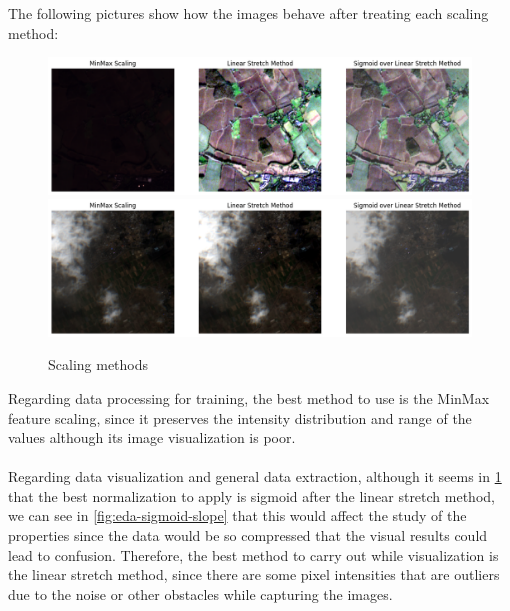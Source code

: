 The following pictures show how the images behave after treating each scaling method:
\begin{figure}[H]
	\centering
	\includegraphics[width=15cm]{imgs/eda/scaled-methods-1}\\
	\includegraphics[width=15cm]{imgs/eda/scaled-methods-2}
	\caption{Scaling methods}
	\label{fig:scaling-methods}
\end{figure}
Regarding data processing for training, the best method to use is the MinMax feature scaling, since it preserves the intensity distribution and range of the values although its image visualization is poor.
\\
\\
Regarding data visualization and general data extraction, although it seems in \ref{fig:scaling-methods} that the best normalization to apply is sigmoid after the linear stretch method, we can see in \ref{fig:eda-sigmoid-slope} that this would affect the study of the properties since the data would be so compressed that the visual results could lead to confusion. Therefore, the best method to carry out while visualization is the linear stretch method, since there are some pixel intensities that are outliers due to the noise or other obstacles while capturing the images.
